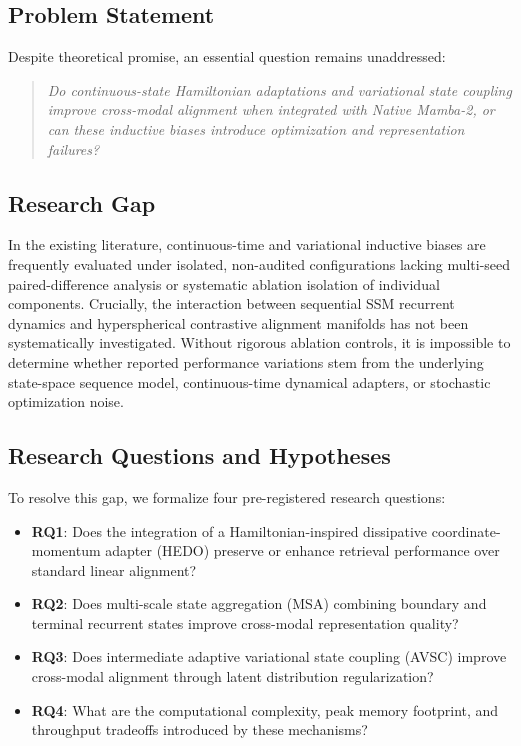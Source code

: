 \documentclass[10pt,journal,final]{IEEEtran}
\begin{document}
\subsection{Problem Statement}
Despite theoretical promise, an essential question remains unaddressed:
\begin{quote}
\textit{Do continuous-state Hamiltonian adaptations and variational state coupling improve cross-modal alignment when integrated with Native Mamba-2, or can these inductive biases introduce optimization and representation failures?}
\end{quote}

\subsection{Research Gap}
In the existing literature, continuous-time and variational inductive biases are frequently evaluated under isolated, non-audited configurations lacking multi-seed paired-difference analysis or systematic ablation isolation of individual components. Crucially, the interaction between sequential SSM recurrent dynamics and hyperspherical contrastive alignment manifolds has not been systematically investigated. Without rigorous ablation controls, it is impossible to determine whether reported performance variations stem from the underlying state-space sequence model, continuous-time dynamical adapters, or stochastic optimization noise.

\subsection{Research Questions and Hypotheses}
To resolve this gap, we formalize four pre-registered research questions:
\begin{itemize}
    \item \textbf{RQ1}: Does the integration of a Hamiltonian-inspired dissipative coordinate-momentum adapter (HEDO) preserve or enhance retrieval performance over standard linear alignment?
    \item \textbf{RQ2}: Does multi-scale state aggregation (MSA) combining boundary and terminal recurrent states improve cross-modal representation quality?
    \item \textbf{RQ3}: Does intermediate adaptive variational state coupling (AVSC) improve cross-modal alignment through latent distribution regularization?
    \item \textbf{RQ4}: What are the computational complexity, peak memory footprint, and throughput tradeoffs introduced by these mechanisms?
\end{itemize}
\end{document}
